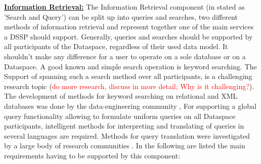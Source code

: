 \uline{\textbf{Information Retrieval:}} The Information Retrieval component (in \cite{Halevy:2006:PDS:1142351.1142352} stated as 'Search and Query') can be split up into queries and searches, two different methods of information retrieval and represent together one of the main services a DSSP should support. Generally, queries and searches should be supported by all participants of the Dataspace, regardless of their used data model. It shouldn't make any difference for a user to operate on a sole database or on a Dataspace. A good known and simple search operation is keyword searching. The Support of spanning such a search method over all participants, is a challenging research topic (\textcolor{red}{do more research, discuss in more detail; Why is it challenging?}). The development of methods for keyword searching on relational and XML databases was done by the data-engineering community \cite{994693, Guo:2003:XRK:872757.872762, Hristidis:2002:DKS:1287369.1287427}, For supporting a global query functionality allowing to formulate uniform queries on all Dataspace participants, intelligent methods for interpreting and translating of queries in several languages are required. Methods for query translation were investigated by a large body of research communities \cite{Carey00xperanto:publishing, 1319983}.
In the following are listed the main requirements having to be supported by this component:

